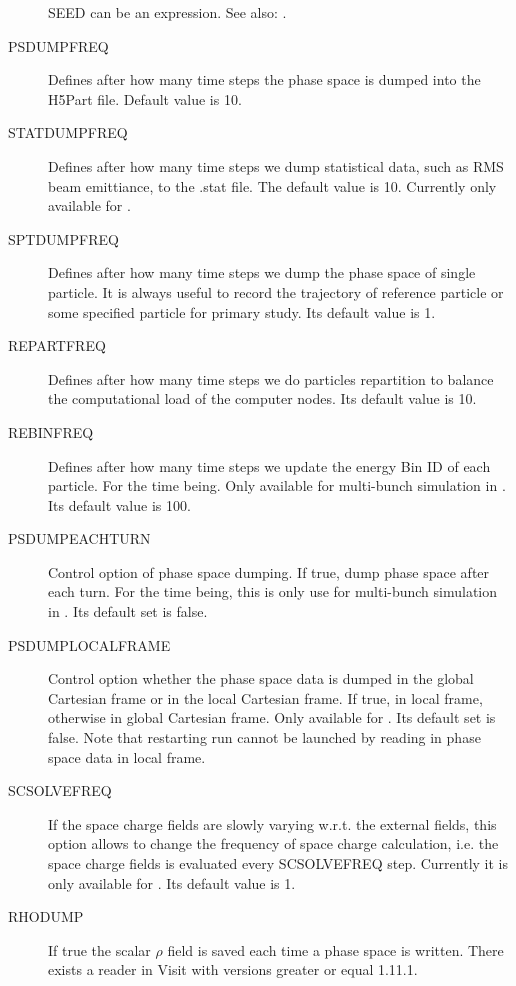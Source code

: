 \begin{description}
  SEED can be an expression.
  See also: .
\item[PSDUMPFREQ]
   Defines after how many time steps the phase space is dumped into the H5Part file. Default value is 10. 
\item[STATDUMPFREQ]
 	Defines after how many time steps we dump statistical data, such as RMS beam emittiance, to the .stat file.
 	The default value is 10. Currently only available for \opalt.
\item[SPTDUMPFREQ]
   Defines after how many time steps we dump the phase space of single particle.
   It is always useful to record the trajectory of reference particle
   or some specified particle for primary study. Its default value is 1.  
\item[REPARTFREQ]
   Defines after how many time steps we do particles repartition to balance the computational load of  
   the computer nodes. Its default value is 10.  
   
\item[REBINFREQ]
   Defines after how many time steps we update the energy Bin ID of each particle. For the time being. 
   Only available for multi-bunch simulation in \opalcycl. Its default value is 100.  

\item[PSDUMPEACHTURN]
 Control option of phase space dumping. If true, dump phase space after each turn. 
 For the time being, this is only use for multi-bunch simulation in \opalcycl. Its default set is false. 

\item[PSDUMPLOCALFRAME]
 Control option whether the phase space data is dumped in the global Cartesian frame or in the local Cartesian frame.
 If true, in local frame, otherwise in global Cartesian frame. Only available for \opalcycl. Its default set is false.
 Note that restarting run cannot be launched by reading in phase space data in local frame.
\item[SCSOLVEFREQ]
 If the space charge fields are slowly varying w.r.t. the external fields,  this option allows to change the frequency of space charge calculation,
 i.e. the space charge fields is evaluated every SCSOLVEFREQ step. Currently it is only available for \opalcycl. Its default value is 1.
\item[RHODUMP]
 If true the scalar $\rho$ field is saved each time a phase space is written. There exists a reader in Visit with versions 
 greater or equal 1.11.1.


\end{description}
